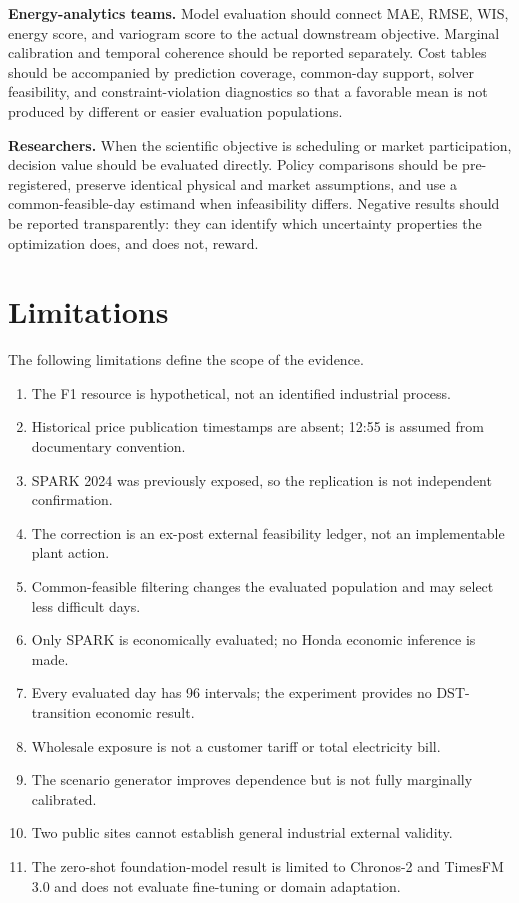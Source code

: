 \documentclass[10pt,twocolumn]{article}
\begin{document}
\textbf{Energy-analytics teams.} Model evaluation should connect MAE, RMSE,
WIS, energy score, and variogram score to the actual downstream objective.
Marginal calibration and temporal coherence should be reported separately.
Cost tables should be accompanied by prediction coverage, common-day support,
solver feasibility, and constraint-violation diagnostics so that a favorable
mean is not produced by different or easier evaluation populations.

\textbf{Researchers.} When the scientific objective is scheduling or market
participation, decision value should be evaluated directly. Policy comparisons
should be pre-registered, preserve identical physical and market assumptions,
and use a common-feasible-day estimand when infeasibility differs. Negative
results should be reported transparently: they can identify which uncertainty
properties the optimization does, and does not, reward.

\section{Limitations}
\label{sec:limitations}

The following limitations define the scope of the evidence.

\begin{enumerate}
  \item The F1 resource is hypothetical, not an identified industrial process.
  \item Historical price publication timestamps are absent; 12:55 is assumed
  from documentary convention.
  \item SPARK 2024 was previously exposed, so the replication is not independent
  confirmation.
  \item The correction is an ex-post external feasibility ledger, not an
  implementable plant action.
  \item Common-feasible filtering changes the evaluated population and may
  select less difficult days.
  \item Only SPARK is economically evaluated; no Honda economic inference is
  made.
  \item Every evaluated day has 96 intervals; the experiment provides no
  DST-transition economic result.
  \item Wholesale exposure is not a customer tariff or total electricity bill.
  \item The scenario generator improves dependence but is not fully marginally
  calibrated.
  \item Two public sites cannot establish general industrial external validity.
  \item The zero-shot foundation-model result is limited to Chronos-2 and
  TimesFM 3.0 and does not evaluate fine-tuning or domain adaptation.
\end{enumerate}
\end{document}
